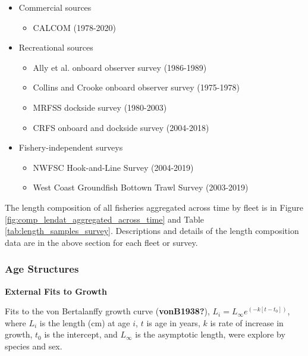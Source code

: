 \documentclass[11pt,
  english,
  a4paper,
]{article}
\begin{document}
\begin{itemize}[noitemsep,nolistsep,topsep=0pt]
  \item Commercial sources
    \begin{itemize}[noitemsep,nolistsep]
      \item CALCOM (1978-2020)   
    \end{itemize}
  \item Recreational sources     
    \begin{itemize}[noitemsep,nolistsep]
      \item Ally et al. onboard observer survey (1986-1989)
      \item Collins and Crooke onboard observer survey (1975-1978)  
      \item MRFSS dockside survey (1980-2003)     
      \item CRFS onboard and dockside survey (2004-2018)
    \end{itemize}
  \item Fishery-independent surveys
     \begin{itemize}[noitemsep,nolistsep]
        \item NWFSC Hook-and-Line Survey (2004-2019) 
        \item West Coast Groundfish Bottown Trawl Survey (2003-2019) 
   \end{itemize}
\end{itemize}

The length composition of all fisheries aggregated across time by fleet is in Figure \ref{fig:comp_lendat_aggregated_across_time} and Table \ref{tab:length_samples_survey}. Descriptions and details of the length composition data are in the above section for each fleet or survey.


\hypertarget{age-structures}{%
\subsubsection{Age Structures}\label{age-structures}}

\leavevmode\tagmcend\tagstructend

\textbf{External Fits to Growth}

Fits to the von Bertalanffy growth curve {(\textbf{vonB1938?})\leavevmode\tagmcend\tagstructend}, {\(L_i = L_{\infty}e^{(-k[t-t_0])}\)\leavevmode\tagmcend\tagstructend}, where {\(L_i\)\leavevmode\tagmcend\tagstructend} is the length (cm) at age {\(i\)\leavevmode\tagmcend\tagstructend}, {\(t\)\leavevmode\tagmcend\tagstructend} is age in years, {\(k\)\leavevmode\tagmcend\tagstructend} is rate of increase in growth, {\(t_0\)\leavevmode\tagmcend\tagstructend} is the intercept, and {\(L_{\infty}\)\leavevmode\tagmcend\tagstructend} is the asymptotic length, were explore by species and sex.
\end{document}
